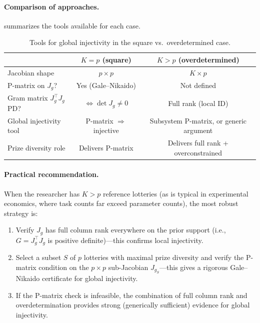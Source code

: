 \documentclass[11pt,a4paper]{article}
\theoremstyle{definition}
\begin{document}
\paragraph{Comparison of approaches.}
 summarizes the tools available for each case.

\begin{table}[ht]
\centering
\begin{tabular}{lcc}
    & $K = p$ (square) & $K > p$ (overdetermined) \\
    \hline
    Jacobian shape & $p \times p$ & $K \times p$ \\
    P-matrix on $J_g$? & Yes (Gale--Nikaido) & Not defined \\
    Gram matrix $J_g^\top J_g$ PD? & $\Leftrightarrow \det J_g \neq 0$
        & Full rank (local ID) \\
    Global injectivity tool & P-matrix $\Rightarrow$ injective
        & Subsystem P-matrix, or generic argument \\
    Prize diversity role & Delivers P-matrix & Delivers full rank +
        overconstrained
\end{tabular}
\caption{Tools for global injectivity in the square vs.\ overdetermined case.}
\label{tab:square_vs_over}
\end{table}

\paragraph{Practical recommendation.}
When the researcher has $K > p$ reference lotteries (as is typical in
experimental economics, where task counts far exceed parameter counts), the
most robust strategy is:
\begin{enumerate}
    \item Verify $J_g$ has full column rank everywhere on the prior support
    (i.e., $G = J_g^\top J_g$ is positive definite)---this confirms local
    injectivity.
    \item Select a subset $S$ of $p$ lotteries with maximal prize diversity
    and verify the P-matrix condition on the $p \times p$ sub-Jacobian
    $J_{g_S}$---this gives a rigorous Gale--Nikaido certificate for global
    injectivity.
    \item If the P-matrix check is infeasible, the combination of full column
    rank and overdetermination provides strong (generically sufficient)
    evidence for global injectivity.
\end{enumerate}
\end{document}
